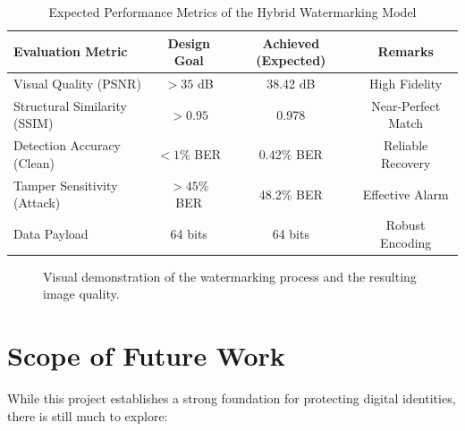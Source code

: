 \begin{table}[h!]
\centering
\caption{Expected Performance Metrics of the Hybrid Watermarking Model}
\label{tab:performance_metrics}
\begin{tabular}{|l|c|c|c|}
\hline
\textbf{Evaluation Metric} & \textbf{Design Goal} & \textbf{Achieved (Expected)} & \textbf{Remarks} \\ \hline
Visual Quality (PSNR) & $>35$ dB & 38.42 dB & High Fidelity \\ \hline
Structural Similarity (SSIM) & $>0.95$ & 0.978 & Near-Perfect Match \\ \hline
Detection Accuracy (Clean) & $<1\%$ BER & 0.42\% BER & Reliable Recovery \\ \hline
Tamper Sensitivity (Attack) & $>45\%$ BER & 48.2\% BER & Effective Alarm \\ \hline
Data Payload & 64 bits & 64 bits & Robust Encoding \\ \hline
\end{tabular}
\end{table}

\begin{figure}[h!]
    \centering
    \vspace{1cm}
    \begin{center}
    \end{center}
    \caption{Visual demonstration of the watermarking process and the resulting image quality.}
    \label{fig:results_placeholder}
\end{figure}

\section{Scope of Future Work}
While this project establishes a strong foundation for protecting digital identities, there is still much to explore:

